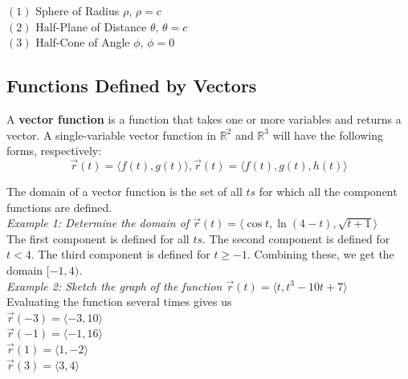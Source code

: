 \documentclass{article}
\begin{document}
            \noindent $(1)$ Sphere of Radius $\rho$, $\rho=c$ \\
            $(2)$ Half-Plane of Distance $\theta$, $\theta=c$ \\
            $(3)$ Half-Cone of Angle $\phi$, $\phi=0$

        \pagebreak
        \subsection{Functions Defined by Vectors}

            A \textbf{vector function} is a function that takes one or more variables and returns a
            vector. A single-variable vector function in $\mathbb{R}^2$ and $\mathbb{R}^3$ will
            have the following forms, respectively: \\

            \begin{equation*}
                \overrightarrow{r}(t)=\langle f(t), g(t)\rangle
                ,
                \overrightarrow{r}(t)=\langle f(t), g(t), h(t) \rangle
            \end{equation*}

            \noindent The domain of a vector function is the set of all $ts$ for which all the
            component functions are defined. \\

            \noindent \textit{Example 1: Determine the domain of
            $\overrightarrow{r}(t)=\langle \cos t, \ln{(4-t)}, \sqrt{t+1}\rangle$} \\
            The first component is defined for all $ts$. The second component is defined for $t<4$.
            The third component is defined for $t\geq-1$. Combining these, we get the domain $[-1,4)$. \\

            \noindent \textit{Example 2: Sketch the graph of the function
            $\overrightarrow{r}(t)=\langle t,t^3-10t+7\rangle$} \\
            Evaluating the function several times gives us \\
            $\overrightarrow{r}(-3)=\langle -3,10\rangle$ \\
            $\overrightarrow{r}(-1)=\langle -1,16 \rangle$ \\
            $\overrightarrow{r}(1)=\langle 1, -2 \rangle$ \\
            $\overrightarrow{r}(3)=\langle 3,4 \rangle$ \\
\end{document}
